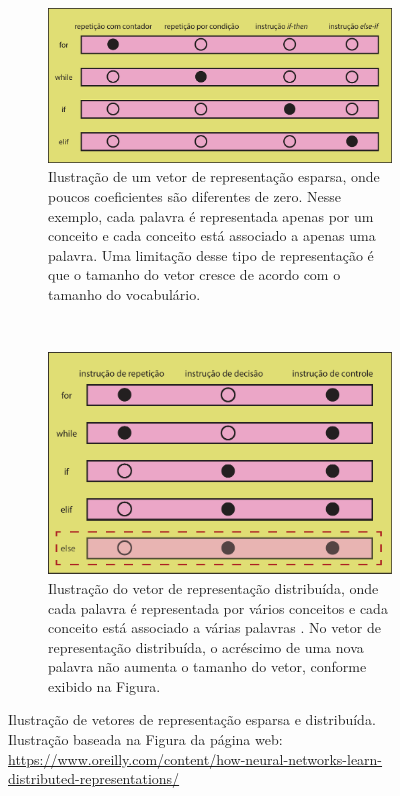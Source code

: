 \begin{figure}[H]
\centering
\begin{subfigure}{.7\textwidth}
  \centering
  \includegraphics[width=1\linewidth]{figuras/cap-trabalhos-relacionados/discrete-representation.pdf}
  \caption{Ilustração de um vetor de representação esparsa, onde poucos coeficientes são diferentes de zero. Nesse exemplo, cada palavra é representada apenas por um conceito e cada conceito está associado a apenas uma palavra. Uma limitação desse tipo de representação é que o tamanho do vetor cresce de acordo com o tamanho do vocabulário.}
  \label{fig:discrete-representation}
\end{subfigure}%
\\
\begin{subfigure}{.7\textwidth}
  \centering
  \includegraphics[width=1\linewidth]{figuras/cap-trabalhos-relacionados/distributed-representation.pdf}
  \caption{Ilustração do vetor de representação distribuída, onde cada palavra é representada por vários conceitos e cada conceito está associado a várias palavras \citep{Hinton-distributed-representatons:1986}. No vetor de representação distribuída, o acréscimo de uma nova palavra não aumenta o tamanho do vetor, conforme exibido na Figura.}
  \label{fig:distributed-representation}
\end{subfigure}

\caption{Ilustração de vetores de representação esparsa e distribuída. Ilustração baseada na Figura da página web: \url{https://www.oreilly.com/content/how-neural-networks-learn-distributed-representations/}}
\label{fig:discrete-vs-distributed-representation}
\end{figure}

